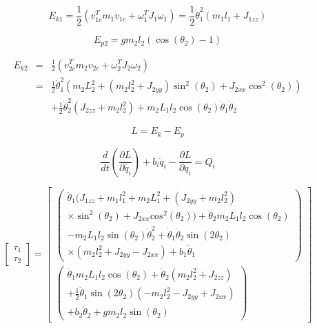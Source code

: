 \begin{equation}
E_{k1}=\frac{1}{2}(v^T_{1c}m_1v_{1c}+\omega^T_1J_1\omega_1)=\frac{1}{2}\dot{\theta}^2_1(m_1l_1+J_{1zz})
\end{equation}

\begin{equation}
E_{p2}=gm_2l_2(\cos(\theta_2)-1)
\end{equation}

\begin{eqnarray}
E_{k2}&=&\frac{1}{2}(v^T_{2c}m_2v_{2c}+\omega^T_2J_2\omega_2)\nonumber \\
&=&\frac{1}{2}\dot{\theta}^2_1(m_2L^2_2+(m_2l^2_2+J_{2yy})\sin^2(\theta_2)+J_{2xx}\cos^2(\theta_2))\nonumber \\
&&+\frac{1}{2}\dot{\theta}^2_2(J_{2zz}+m_2l^2_2)+m_2L_1l_2\cos(\theta_2)\dot{\theta}_1\dot{\theta}_2
\end{eqnarray}

\begin{equation}
L=E_k-E_p
\end{equation}

\begin{equation}
\frac{d}{dt}(\frac{\partial L}{\partial\dot{q_i}})+b_i\dot{q}_i-\frac{\partial L}{\partial q_i}=Q_i
\end{equation}

\begin{equation}
\begin{bmatrix}
\tau_1 \\
\tau_2
\end{bmatrix}
=
\begin{bmatrix}
\begin{pmatrix}
\ddot{\theta}_1(J_{1zz}+m_1l^2_1+m_2L^2_1+(J_{2yy}+m_2l^2_2) 						\\
\times \sin^2(\theta_2)+J_{2xx}cos^2(\theta_2))+\ddot{\theta}_2m_2L_1l_2\cos(\theta_2)			\\
-m_2L_1l_2\sin(\theta_2)\dot{\theta}^2_2+\dot{\theta}_1\dot{\theta}_2\sin(2\theta_2)	\\
\times(m_2l^2_2+J_{2yy}-J_{2xx})+b_1\dot{\theta}_1
\end{pmatrix}
\\
\begin{pmatrix}
\ddot{\theta}_1m_2L_1l_2\cos(\theta_2)+\ddot{\theta}_2(m_2l^2_2+J_{2zz})	\\
+\frac{1}{2}\dot{\theta}_1\sin(2\theta_2)(-m_2l^2_2-J_{2yy}+J_{2xx})						\\
+b_2\dot{\theta}_2+gm_2l_2\sin(\theta_2)
\end{pmatrix}
\end{bmatrix}
\end{equation}

